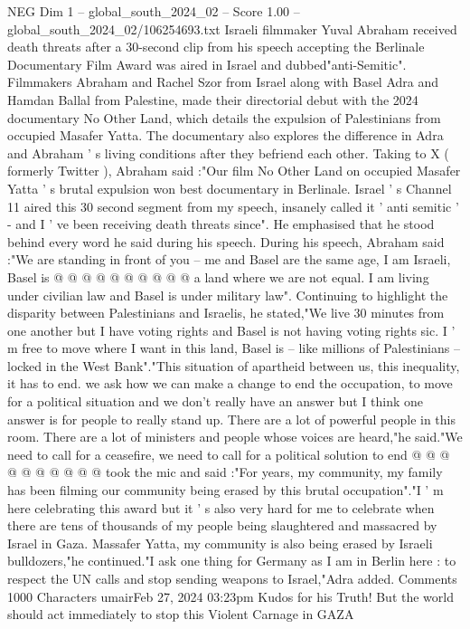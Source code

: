 \begin{textsample}{NEG Dim 1 – global\_south\_2024\_02 – Score 1.00 – global\_south\_2024\_02/106254693.txt}  \label{ex:f1_neg_420}
Israeli filmmaker Yuval Abraham received death threats after a 30-second clip from his speech accepting the Berlinale Documentary Film Award was aired in Israel and dubbed"anti-Semitic".
Filmmakers Abraham and Rachel Szor from Israel along with Basel Adra and Hamdan Ballal from Palestine, made their directorial debut with the 2024 documentary No Other Land, which details the expulsion of Palestinians from occupied Masafer Yatta.
The documentary also explores the difference in Adra and Abraham ' s living conditions after they befriend each other.
Taking to X ( formerly Twitter ), Abraham said :"Our film No Other Land on occupied Masafer Yatta ' s brutal expulsion won best documentary in Berlinale.
Israel ' s Channel 11 aired this 30 second segment from my speech, insanely called it ' anti semitic ' - and I ' ve been receiving death threats since".
He emphasised that he stood behind every word he said during his speech.
During his speech, Abraham said :"We are standing in front of you -- me and Basel are the same age, I am Israeli, Basel is @ @ @ @ @ @ @ @ @ @ a land where we are not equal.
I am living under civilian law and Basel is under military law".
Continuing to highlight the disparity between Palestinians and Israelis, he stated,"We live 30 minutes from one another but I have voting rights and Basel is not having voting rights sic.
I ' m free to move where I want in this land, Basel is -- like millions of Palestinians -- locked in the West Bank"."This situation of apartheid between us, this inequality, it has to end. we ask how we can make a change to end the occupation, to move for a political situation and we don't really have an answer but I think one answer is for people to really stand up.
There are a lot of powerful people in this room.
There are a lot of ministers and people whose voices are heard,"he said."We need to call for a ceasefire, we need to call for a political solution to end @ @ @ @ @ @ @ @ @ @ took the mic and said :"For years, my community, my family has been filming our community being erased by this brutal occupation"."I ' m here celebrating this award but it ' s also very hard for me to celebrate when there are tens of thousands of my people being slaughtered and massacred by Israel in Gaza.
Massafer Yatta, my community is also being erased by Israeli bulldozers,"he continued."I ask one thing for Germany as I am in Berlin here : to respect the UN calls and stop sending weapons to Israel,"Adra added.
Comments 1000 Characters umairFeb 27, 2024 03:23pm Kudos for his Truth!
But the world should act immediately to stop this Violent Carnage in GAZA

\end{textsample}
